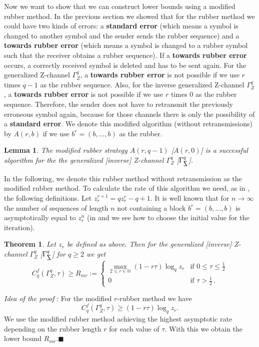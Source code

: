 \documentclass[conference]{IEEEtran}
\def\qed{\hfill $\blacksquare$}
\newtheorem{Theorem}{Theorem}
\newtheorem{Lemma}{Lemma}
\def\NN{{\mathbb N}}
\begin{document}
Now we want to show that we can construct lower bounds using 
a modified rubber method.
In the previous section we showed that for the rubber method we could have two kinds of errors:
a {\bf standard error} (which means a symbol is changed to another symbol and
the sender sends the rubber sequence) and a {\bf towards rubber error} (which means a symbol is changed to a rubber symbol such that the receiver obtains a rubber sequence). If a {\bf towards rubber error} occurs, a correctly received symbol is deleted and has to be sent again.
For the generalized Z-channel $\Gamma_Z^q$, a {\bf towards rubber error}
is not possible if we use $r$ times $q-1$ as the rubber sequence. Also, for the
inverse generalized Z-channel $\Gamma_Z^q$, a {\bf towards rubber error}
is not possible if we use $r$ times $0$ as the rubber sequence. Therefore, the sender does not have to retransmit the previously erroneous symbol again, because for those channels there is only the possibility of a {\bf standard error}. We denote this modified algorithm (without retransmissions) by $A(r,b)$ if we use
$b^r=(b,\dots, b)$ as the rubber. 
\begin{Lemma}\label{th:rubber_retransmission}
	The modified rubber strategy $A(r,q-1)$ [$A(r,0)$] is a successful algorithm
	for the the generalized [inverse] Z-channel $\Gamma_Z^q$ [$\Gamma_{\reflectbox{$\mathsf{Z}$}}^q$].
\end{Lemma}
In the following, we denote this rubber method without retransmission as the modified rubber method.
To calculate the rate of this algorithm we need, as in \cite{ADL05}, the following definitions. Let $z_r^{r+1}=qz^r_r-q+ 1$. It is well known that for $n \rightarrow \infty $ the number of sequences of length $n$ not containing a block $b^r=(b,\dots, b)$ is asymptotically equal to $z_r^{n}$ (in
\cite{ADL05} and \cite{B77} we see how to choose the initial value for the iteration). 


\begin{Theorem}\label{cor:rubber}
	Let $z_r$ be defined as above. Then for the generalized [inverse] Z-channel $\Gamma_Z^q$ [$\Gamma_{\reflectbox{$\mathsf{Z}$}}^q$] for $q \geq 2$ we get 
	 \begin{equation*}
        C_q^f(\Gamma_Z^q,\tau) \geq R_{mr}:= \begin{cases}
	\max\limits_{2\leq r\in\NN} (1-r\tau) \log_q z_r& \text{if } 0 \leq \tau \leq \frac{1}{2}\\
	0 & \text{if } \tau > \frac{1}{2}\, .
	\end{cases}
	\end{equation*}
\end{Theorem}
{\it Idea of the proof} : For the modified $r$-rubber method
we have
\begin{equation*}
	C_q^f(\Gamma_Z^q,\tau ) \geq (1-r\tau) \log_q z_r. 
	\end{equation*}
We use the modified rubber method achieving the highest asymptotic rate depending on the rubber length $r$ for each value of $\tau$. With this we obtain the lower bound $R_{mr}$.\qed
\end{document}
